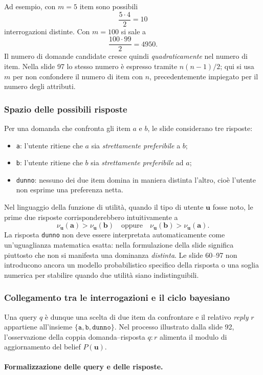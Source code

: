 Ad esempio, con $m=5$ item sono possibili
\[
\frac{5\cdot4}{2}=10
\]
interrogazioni distinte. Con $m=100$ si sale a
\[
\frac{100\cdot99}{2}=4950.
\]
Il numero di domande candidate cresce quindi \emph{quadraticamente} nel numero di item. Nella slide 97 lo stesso numero è espresso tramite $n(n-1)/2$; qui si usa $m$ per non confondere il numero di item con $n$, precedentemente impiegato per il numero degli attributi.

\subsubsection{Spazio delle possibili risposte}
Per una domanda che confronta gli item $a$ e $b$, le slide considerano tre risposte:
\begin{itemize}
    \item \texttt{a}: l'utente ritiene che $a$ sia \emph{strettamente preferibile} a $b$;
    \item \texttt{b}: l'utente ritiene che $b$ sia \emph{strettamente preferibile} ad $a$;
    \item \texttt{dunno}: nessuno dei due item domina in maniera distinta l'altro, cioè l'utente non esprime una preferenza netta.
\end{itemize}
Nel linguaggio della funzione di utilità, quando il tipo di utente $\mathbf u$ fosse noto, le prime due risposte corrisponderebbero intuitivamente a
\[
\nu_{\mathbf u}(\mathbf a)>\nu_{\mathbf u}(\mathbf b)
\quad\text{oppure}\quad
\nu_{\mathbf u}(\mathbf b)>\nu_{\mathbf u}(\mathbf a).
\]
La risposta \texttt{dunno} non deve essere interpretata automaticamente come un'uguaglianza matematica esatta: nella formulazione della slide significa piuttosto che non si manifesta una dominanza \emph{distinta}. Le slide 60--97 non introducono ancora un modello probabilistico specifico della risposta o una soglia numerica per stabilire quando due utilità siano indistinguibili.

\subsubsection{Collegamento tra le interrogazioni e il ciclo bayesiano}
Una query $q$ è dunque una scelta di due item da confrontare e il relativo \emph{reply} $r$ appartiene all'insieme $\{\texttt{a},\texttt{b},\texttt{dunno}\}$. Nel processo illustrato dalla slide 92, l'osservazione della coppia domanda--risposta $q:r$ alimenta il modulo di aggiornamento del belief $P(\mathbf u)$.


\paragraph{Formalizzazione delle query e delle risposte.}

